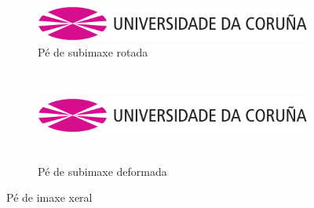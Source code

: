 \begin{figure}[hp!]
  \centering
  \begin{subfigure}[c]{0.3\textwidth}
    \includegraphics[angle=45,width=\textwidth]{imaxes/udc.png}
    \caption{Pé de subimaxe rotada}
    \label{fig:subfigura-rotada}
  \end{subfigure}
  \hspace{0.1\textwidth}
  \begin{subfigure}[c]{0.3\textwidth}
    \includegraphics[width=\textwidth,height=3cm]{imaxes/udc.png}
    \caption{Pé de subimaxe deformada}
    \label{fig:subfigura-deformada}
  \end{subfigure}
  \caption{Pé de imaxe xeral}
  \label{fig:exemplo-subfiguras}
\end{figure}
